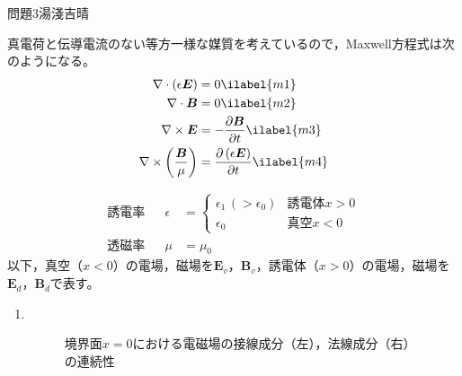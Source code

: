 \documentclass[fleqn]{jbook}
\begin{document}
\begin{answer}{問題3}{湯淺吉晴}
\setcounter{equation}{0}

真電荷と伝導電流のない等方一様な媒質を考えているので，Maxwell方程式は次のようになる。
\begin{align}
\nabla \cdot (\epsilon \boldsymbol{E}) &= 0 \ilabel{m1} \\
\nabla \cdot \boldsymbol{B} &= 0 \ilabel{m2} \\
\nabla \times \boldsymbol{E} &= -\frac{\partial \boldsymbol{B}}{\partial t} \ilabel{m3} \\
\nabla \times \left(\frac{\boldsymbol{B}}{\mu}\right) &= \frac{\partial \,(\epsilon \boldsymbol{E})}{\partial t} \ilabel{m4}
\end{align}

\begin{align}
\text{誘電率} && \epsilon &= 
\begin{cases}
\epsilon_1\,( > \epsilon_0) & \text{誘電体}x > 0 \\
\epsilon_0 & \text{真空}x < 0
\end{cases} \nonumber \\
\text{透磁率} && \mu &= \mu_0 \nonumber
\end{align}
以下，真空（$x < 0$）の電場，磁場を$\boldsymbol{E}_v$，$\boldsymbol{B}_v$，誘電体（$x > 0$）の電場，磁場を$\boldsymbol{E}_d$，$\boldsymbol{B}_d$で表す。
\begin{enumerate}
\item 　
\vspace{-1.0cm}
\begin{figure}[hbtp]
\begin{center}
\caption[境界面$x = 0$における電磁場の接線成分（左），法線成分（右）の連続性]{
境界面$x = 0$における電磁場の接線成分（左），法線成分（右）の連続性}
\vspace{2mm}

\end{center}
\end{figure}

\begin{enumerate}



\end{enumerate}
\end{enumerate}
\end{answer}
\end{document}
